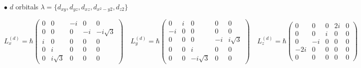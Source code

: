 \documentclass{article}
\begin{document}
 \vspace{0.5cm}
\noindent
$\bullet$ $d$ orbitals $\lambda=\{d_{xy},d_{yz},d_{xz},d_{x^2-y2},d_{z2}\}$

\begin{equation*}
L_x^{(d)}= \hbar \begin{pmatrix}
0&0&-i&0&0 \\
0&0&0&-i&-i\sqrt{3} \\
i&0&0&0&0 \\
0&i&0&0&0  \\
0&i\sqrt{3}&0&0&0
\end{pmatrix}
\quad
L_y^{(d)}= \hbar \begin{pmatrix}
0&i&0&0&0 \\
-i&0&0&0&0 \\
0&0&0&-i&i\sqrt{3} \\
0&0&i&0&0  \\
0&0&-i\sqrt{3}&0&0
\end{pmatrix}
\quad
L_z^{(d)}= \hbar \begin{pmatrix}
0&0&0&2i&0 \\
0&0&i&0&0 \\
0&-i&0&0&0 \\
-2i&0&0&0&0  \\
0&0&0&0&0
\end{pmatrix}
\end{equation*}








\vfil
\pagebreak


\end{document}
